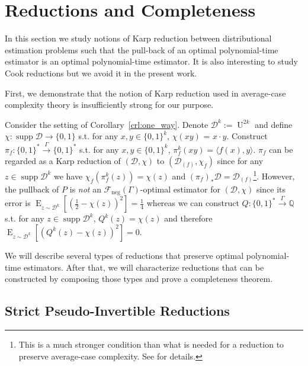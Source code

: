 \documentclass{article}
\numberwithin{equation}{section}
\theoremstyle{definition}
\theoremstyle{plain}
\newcommand{\Bool}{\{0,1\}}
\newcommand{\Words}{{\Bool^*}}
\DeclareMathOperator{\Supp}{supp}
\DeclareMathOperator{\E}{E}
\DeclareMathOperator{\Un}{U}
\newcommand{\Rats}{\mathbb{Q}}
\newcommand{\Chev}[1]{\langle #1 \rangle}
\newcommand{\Dist}{\mathcal{D}}
\newcommand{\Fall}{\mathcal{F}}
\newcommand{\Scheme}{\xrightarrow{\Gamma}}
\begin{document}
\section{Reductions and Completeness}
\label{sec:reductions}

In this section we study notions of Karp reduction between distributional estimation problems such that the pull-back of an optimal polynomial-time estimator is an optimal polynomial-time estimator. It is also interesting to study Cook reductions but we avoid it in the present work.

First, we demonstrate that the notion of Karp reduction used in average-case complexity theory is insufficiently strong for our purpose. 

Consider the setting of Corollary~\ref{crl:one_way}. Denote $\Dist^k:=\Un^{2k}$ and define ${\chi: \Supp \Dist \rightarrow \Bool}$ s.t. for any $x,y \in \Bool^k$, $\chi(xy)$ = $x \cdot y$. Construct $\pi_f: \Words \Scheme \Words$ s.t. for any $x,y \in \Bool^k$, ${\pi_f^k(xy) = \Chev{f(x),y}}$. $\pi_f$ can be regarded as a Karp reduction of $(\Dist, \chi)$ to $(\Dist_{(f)},\chi_f)$ since for any ${z \in \Supp \Dist^k}$ we have $\chi_f(\pi_f^k(z))=\chi(z)$ and $(\pi_f)_*\Dist=\Dist_{(f)}$\footnote{This is a much stronger condition than what is needed for a reduction to preserve average-case complexity. See \cite{Bogdanov_2006} for details.}. However, the pullback of $P$ is \emph{not} an $\Fall_{\text{neg}}(\Gamma)$-optimal estimator for $(\Dist,\chi)$ since its error is $\E_{z \sim \Dist^k}[(\frac{1}{2}-\chi(z))^2]=\frac{1}{4}$ whereas we can construct $Q: \Words \Scheme \Rats$ s.t. for any $z \in \Supp \Dist^k$, $Q^k(z)=\chi(z)$ and therefore $\E_{z \sim \Dist^k}[(Q^k(z)-\chi(z))^2]=0$.

We will describe several types of reductions that preserve optimal polynomial-time estimators. After that, we will characterize reductions that can be constructed by composing those types and prove a completeness theorem.

\subsection{Strict Pseudo-Invertible Reductions}
\end{document}
